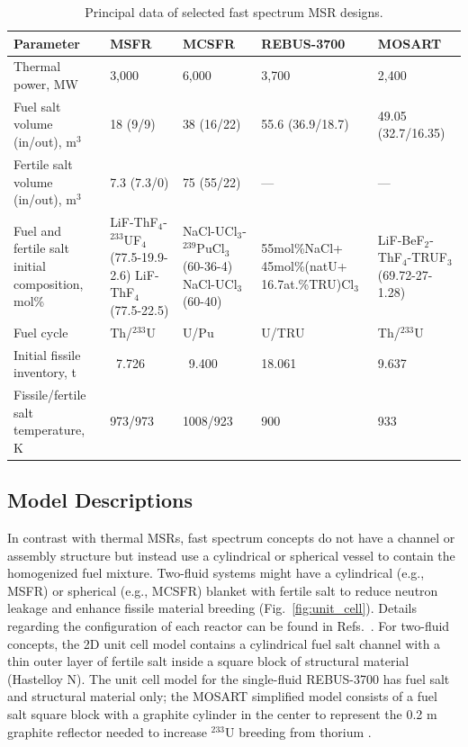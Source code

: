 \documentclass[letterpaper]{mandc2019}
\begin{document}
\begin{table}[t!]
\vspace{-0.3in}
  \centering
  \caption{Principal data of selected fast spectrum \gls{MSR} designs.}
  \label{table:fsmsr_concepts}
  \begin{tabular}{p{} p{} p{} p{} p{}} \toprule
   Parameter & \gls{MSFR} \cite{euratom_final_2015} & \gls{MCSFR} \cite{simmons_assessment_1974} & REBUS-3700 \cite{mourogov_potentialities_2006-1} & \gls{MOSART}  \cite{ignatiev_progress_2007}\\ \midrule
   Thermal power, MW 				&  3,000 & 6,000     & 3,700 & 2,400   \\
   Fuel salt volume (in/out), m$^3$       &18 (9/9)& 38 (16/22)& 55.6 (36.9/18.7) & 49.05 (32.7/16.35) \\
   Fertile salt volume (in/out), m$^3$ & 7.3 (7.3/0) & 75 (55/22)    & --- & --- \\
   Fuel and fertile salt initial composition, mol\% & LiF-ThF$_4$-$^{233}$UF$_4$ (77.5-19.9-2.6) LiF-ThF$_4$ \newline (77.5-22.5) & NaCl-UCl$_3$-$^{239}$PuCl$_3$ (60-36-4) \newline NaCl-UCl$_3$ \newline (60-40)
   & 55mol\%NaCl+ 45mol\%(natU+ 16.7at.\%TRU)Cl$_3$
   & LiF-BeF$_2$-ThF$_4$-TRUF$_3$  \newline (69.72-27-1.28) \\
   Fuel cycle & Th/$^{233}$U & U/Pu  & U/TRU & Th/$^{233}$U \\
   Initial fissile inventory, t & \ 7.726 & \ 9.400    & 18.061 & 9.637 \\ 
   Fissile/fertile salt temperature, K & 973/973 & 1008/923 & 900 & 933 \\ \bottomrule
   \end{tabular}
\end{table}
\subsection{Model Descriptions}
In contrast with thermal \gls{MSR}s, fast spectrum concepts do not have a channel or assembly structure but instead use a cylindrical or spherical vessel to contain the homogenized fuel mixture.
Two-fluid systems might have a cylindrical (e.g., \gls{MSFR}) or spherical (e.g., \gls{MCSFR}) blanket with fertile salt to reduce neutron leakage and enhance fissile material breeding (Fig.~\ref{fig:unit_cell}). 
Details regarding the configuration of each reactor can be found in Refs.~\cite{euratom_final_2015, simmons_assessment_1974, mourogov_potentialities_2006-1,ignatiev_progress_2007}. 
For two-fluid concepts, the 2D unit cell model contains a cylindrical fuel salt channel with a thin outer layer of fertile salt inside a square block of structural material (Hastelloy N). 
The unit cell model for the single-fluid REBUS-3700 has fuel salt and structural material only; the \gls{MOSART} simplified model consists of a fuel salt square block with a graphite cylinder in the center to represent the 0.2 m graphite reflector needed to increase $^{233}$U breeding from thorium \cite{anshuman_chaube_arfc_2018}.
\end{document}
